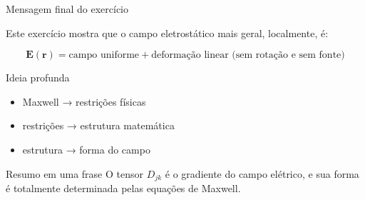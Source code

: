 \documentclass[aspectratio=169,11pt]{beamer}
\begin{document}
\begin{frame}{Mensagem final do exercício}

\begin{mybox}
\justifying
Este exercício mostra que o campo eletrostático mais geral, localmente, é:
\end{mybox}


\begin{eqbox}
\begin{equation}
\mathbf{E}(\mathbf{r})
=
\text{campo uniforme}
+
\text{deformação linear (sem rotação e sem fonte)}
\end{equation}
\end{eqbox}


\begin{block}{Ideia profunda}
\begin{itemize}
    \item Maxwell → restrições físicas
    \item restrições → estrutura matemática
    \item estrutura → forma do campo
\end{itemize}
\end{block}


\begin{alertblock}{Resumo em uma frase}
O tensor \(D_{jk}\) é o gradiente do campo elétrico, e sua forma é totalmente determinada pelas equações de Maxwell.
\end{alertblock}

\end{frame}
\end{document}
